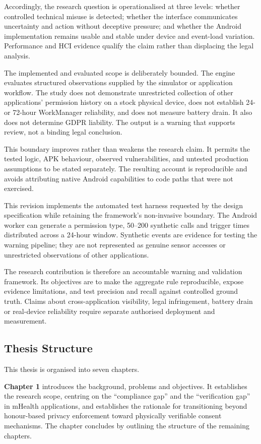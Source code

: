 Accordingly, the research question is operationalised at three levels: whether controlled technical misuse is detected; whether the interface communicates uncertainty and action without deceptive pressure; and whether the Android implementation remains usable and stable under device and event-load variation. Performance and HCI evidence qualify the claim rather than displacing the legal analysis.

The implemented and evaluated scope is deliberately bounded. The engine evaluates structured observations supplied by the simulator or application workflow. The study does not demonstrate unrestricted collection of other applications' permission history on a stock physical device, does not establish 24- or 72-hour WorkManager reliability, and does not measure battery drain. It also does not determine GDPR liability. The output is a warning that supports review, not a binding legal conclusion.

This boundary improves rather than weakens the research claim. It permits the tested logic, APK behaviour, observed vulnerabilities, and untested production assumptions to be stated separately. The resulting account is reproducible and avoids attributing native Android capabilities to code paths that were not exercised.

This revision implements the automated test harness requested by the design specification while retaining the framework's non-invasive boundary. The Android worker can generate a permission type, 50--200 synthetic calls and trigger times distributed across a 24-hour window. Synthetic events are evidence for testing the warning pipeline; they are not represented as genuine sensor accesses or unrestricted observations of other applications.

The research contribution is therefore an accountable warning and validation framework. Its objectives are to make the aggregate rule reproducible, expose evidence limitations, and test precision and recall against controlled ground truth. Claims about cross-application visibility, legal infringement, battery drain or real-device reliability require separate authorised deployment and measurement.

\subsection{Thesis Structure}

This thesis is organised into seven chapters.

\textbf{Chapter 1} introduces the background, problems and objectives. It establishes the research scope, centring on the ``compliance gap'' and the ``verification gap'' in mHealth applications, and establishes the rationale for transitioning beyond honour-based privacy enforcement toward physically verifiable consent mechanisms. The chapter concludes by outlining the structure of the remaining chapters.

